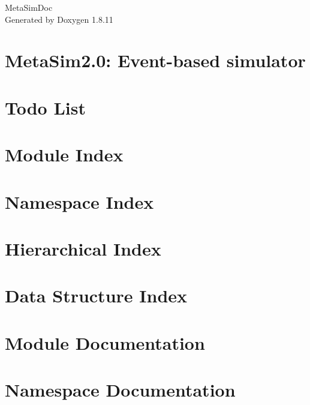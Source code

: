 \documentclass[twoside]{book}
\newcommand{\+}{\discretionary{\mbox{\scriptsize$\hookleftarrow$}}{}{}}
\newcommand{\clearemptydoublepage}{%
  \newpage{\pagestyle{empty}\cleardoublepage}%
}
\begin{document}
\hypersetup{pageanchor=false,
             bookmarksnumbered=true,
             pdfencoding=unicode
            }
\begin{titlepage}
\vspace*{7cm}
\begin{center}%
{\Large Meta\+Sim\+Doc }\\
\vspace*{1cm}
{\large Generated by Doxygen 1.8.11}\\
\end{center}
\end{titlepage}
\clearemptydoublepage
\tableofcontents
\clearemptydoublepage
{}
\hypersetup{pageanchor=true}

\chapter{Meta\+Sim2.0\+: Event-\/based simulator}
\label{md_README}
\hypertarget{md_README}{}

\chapter{Todo List}
\label{todo}
\hypertarget{todo}{}

\chapter{Module Index}

\chapter{Namespace Index}

\chapter{Hierarchical Index}

\chapter{Data Structure Index}

\chapter{Module Documentation}


\chapter{Namespace Documentation}


\end{document}
